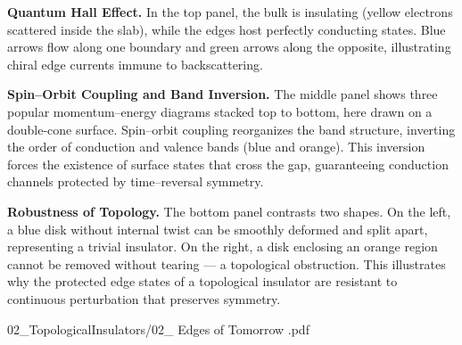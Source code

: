 \begin{SideNotePage}{

  \textbf{Quantum Hall Effect.} \; In the top panel, the bulk is insulating (yellow electrons scattered inside the slab), while the edges host perfectly conducting states. Blue arrows flow along one boundary and green arrows along the opposite, illustrating chiral edge currents immune to backscattering.

  \vspace{0.5em}
  \textbf{Spin–Orbit Coupling and Band Inversion.} \; The middle panel shows three popular momentum–energy diagrams stacked top to bottom, here drawn on a double-cone surface. Spin–orbit coupling reorganizes the band structure, inverting the order of conduction and valence bands (blue and orange). This inversion forces the existence of surface states that cross the gap, guaranteeing conduction channels protected by time–reversal symmetry.

  \vspace{0.5em}
  \textbf{Robustness of Topology.} \; The bottom panel contrasts two shapes. On the left, a blue disk without internal twist can be smoothly deformed and split apart, representing a trivial insulator. On the right, a disk enclosing an orange region cannot be removed without tearing — a topological obstruction. This illustrates why the protected edge states of a topological insulator are resistant to continuous perturbation that preserves symmetry.

}{02_TopologicalInsulators/02_ Edges of Tomorrow .pdf}
\end{SideNotePage}